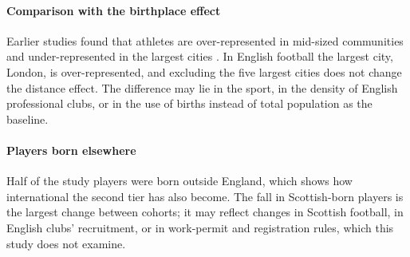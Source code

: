 \paragraph{Comparison with the birthplace effect} Earlier studies found that athletes are over-represented in mid-sized communities and under-represented in the largest cities \cite{cote2006,macdonald2009}. In English football the largest city, London, is over-represented, and excluding the five largest cities does not change the distance effect. The difference may lie in the sport, in the density of English professional clubs, or in the use of births instead of total population as the baseline.

\paragraph{Players born elsewhere} Half of the study players were born outside England, which shows how international the second tier has also become. The fall in Scottish-born players is the largest change between cohorts; it may reflect changes in Scottish football, in English clubs' recruitment, or in work-permit and registration rules, which this study does not examine.

